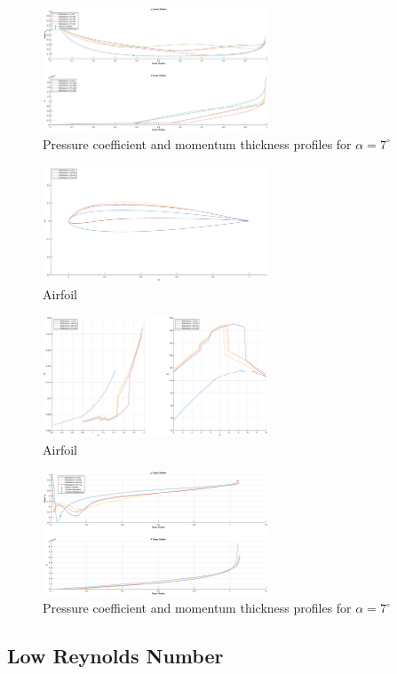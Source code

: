 \documentclass{article}
\begin{document}
\begin{figure}[H]
    \centering
    \includegraphics[width=0.6\textwidth]{figures/hiRe_lowerprofile_17_a7.eps}
    \caption{Pressure coefficient and momentum thickness profiles for $\alpha = 7^\circ$}
    \label{fig:airfoil}
\end{figure}
\begin{figure}[H]
    \centering
    \includegraphics[width=0.6\textwidth]{figures/hiRe_geometry_21.eps}
    \caption{Airfoil}
    \label{fig:airfoil}
\end{figure}
\begin{figure}[H]
    \centering
    \includegraphics[width=0.6\textwidth]{figures/hiRe_lod_21.eps}
    \caption{Airfoil}
    \label{fig:airfoil}
\end{figure}
\begin{figure}[H]
    \centering
    \includegraphics[width=0.6\textwidth]{figures/hiRe_upperprofile_21_a7.eps}
    \caption{Pressure coefficient and momentum thickness profiles for $\alpha = 7^\circ$}
    \label{fig:airfoil}
\end{figure}

\subsection{Low Reynolds Number}
\end{document}
